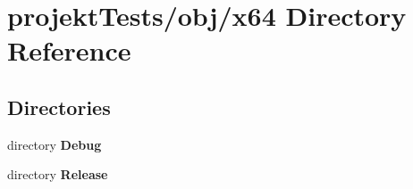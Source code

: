 \section{projekt\+Tests/obj/x64 Directory Reference}
\label{dir_80de96dccdcaa6695abbb8612039b1dc}
\subsection*{Directories}
\begin{DoxyCompactItemize}
\item 
directory \textbf{ Debug}
\item 
directory \textbf{ Release}
\end{DoxyCompactItemize}
